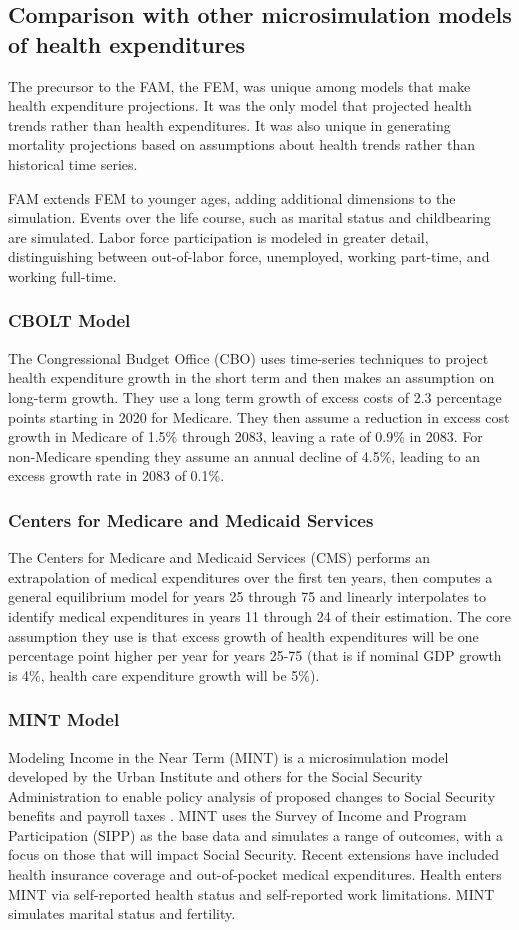 \subsection{Comparison with other microsimulation models of health expenditures}
The precursor to the FAM, the FEM, was unique among models that make health expenditure projections.  It was the only 
model that projected health trends rather than health expenditures.  It was also unique in generating mortality projections
based on assumptions about health trends rather than historical time series.

FAM extends FEM to younger ages, adding additional dimensions to the simulation.  Events over the life course, such as marital status
and childbearing are simulated.  Labor force participation is modeled in greater detail, distinguishing between out-of-labor force, unemployed, 
working part-time, and working full-time.

\subsubsection{CBOLT Model}
The Congressional Budget Office (CBO) uses time-series techniques to project health expenditure 
growth in the short term and then makes an assumption on long-term growth. They use a long term 
growth of excess costs of 2.3 percentage points starting in 2020 for Medicare. They then assume a 
reduction in excess cost growth in Medicare of 1.5\% through 2083, leaving a rate of 0.9\% in 2083. 
For non-Medicare spending they assume an annual decline of 4.5\%, leading to an excess growth rate in 
2083 of 0.1\%. 

\subsubsection{Centers for Medicare and Medicaid Services}
The Centers for Medicare and Medicaid Services (CMS) performs an extrapolation of medical expenditures 
over the first ten years, then computes a general equilibrium model for years 25 through 75 and 
linearly interpolates to identify medical expenditures in years 11 through 24 of their estimation. 
The core assumption they use is that excess growth of health expenditures will be one percentage point 
higher per year for years 25-75 (that is if nominal GDP growth is 4\%, health care expenditure growth 
will be 5\%).

\subsubsection{MINT Model}
Modeling Income in the Near Term (MINT) is a microsimulation model developed by the Urban Institute and others 
for the Social Security Administration to enable policy analysis of proposed changes to Social Security benefits and payroll
taxes \citet{smith2013mint}.  MINT uses the Survey of Income and Program Participation (SIPP) as the base data and simulates a range of outcomes, 
with a focus on those that will impact Social Security.  Recent extensions have included health insurance coverage and
out-of-pocket medical expenditures.  Health enters MINT via self-reported health status and self-reported work limitations.  MINT
simulates marital status and fertility. 

